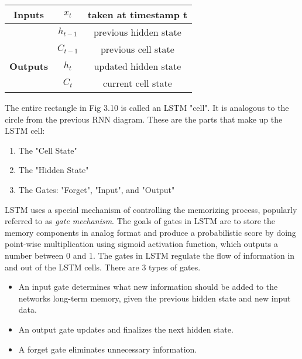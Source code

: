 \label{table:1} 
\begin{center}
\begin{tabular}{|c|c|c|}   
\hline   \textbf{Inputs} 	& \textbf{$x_t$} 		&  taken at timestamp t\\   
\hline    						& \textbf{$h_{t-1}$} & previous hidden state \\ 
\hline    						& \textbf{$C_{t-1}$} & previous cell state  \\  
\hline    \textbf{Outputs} & \textbf{$h_t$} 		& updated hidden state  \\    
\hline    						& \textbf{$C_t$} 		& current cell state  \\ 
\hline   
\end{tabular}   
\end{center}   

The entire rectangle in Fig 3.10 is called an LSTM "cell". It is analogous to the circle from the previous RNN diagram. These are the parts that make up the LSTM cell:

\begin{enumerate}
\item The "Cell State"
\item The "Hidden State"
\item The Gates: "Forget", "Input", and "Output"
\end{enumerate}

LSTM uses a special mechanism of controlling the memorizing process, popularly referred to as \textit{gate mechanism}. The goals of gates in LSTM are to store the memory components in analog format and produce a probabilistic score by doing point-wise multiplication using sigmoid activation function, which outputs a number between 0 and 1. The gates in LSTM regulate the flow of information in and out of the LSTM cells. There are 3 types of gates. 

\begin{itemize}
	\item An input gate determines what new information should be added to the networks long-term memory, given the previous hidden state and new input data.

	\item An output gate updates and finalizes the next hidden state.

	\item A forget gate eliminates unnecessary information.
\end{itemize}

